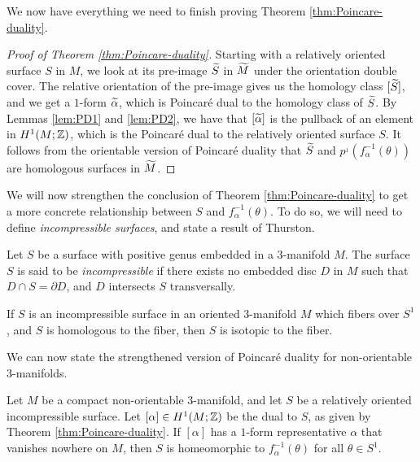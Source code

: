 We now have everything we need to finish proving Theorem \ref{thm:Poincare-duality}.
\begin{proof}[Proof of Theorem \ref{thm:Poincare-duality}]
  Starting with a relatively oriented surface $S$ in $M$, we look at its pre-image $\widetilde{S}$ in $\widetilde{M}$ under the orientation double cover.
  The relative orientation of the pre-image gives us the homology class $[\widetilde{S}]$, and we get a $1$-form $\widetilde{\alpha}$, which is Poincar\'e dual to the homology class of $\widetilde{S}$.
  By Lemmas \ref{lem:PD1} and \ref{lem:PD2}, we have that $[\widetilde{\alpha}]$ is the pullback of an element in $H^1(M; \mathbb{Z})$, which is the Poincar\'e dual to the relatively oriented surface $S$.
  It follows from the orientable version of Poincar\'e duality that $\widetilde{S}$ and $p^{_1}(f_{\alpha}^{-1}(\theta))$ are homologous surfaces in $\widetilde{M}$.
\end{proof}

We will now strengthen the conclusion of Theorem \ref{thm:Poincare-duality} to get a more concrete relationship between $S$ and $f_{\alpha}^{-1}(\theta)$.
To do so, we will need to define \emph{incompressible surfaces}, and state a result of Thurston.

\begin{defn}
  Let $S$ be a surface with positive genus embedded in a $3$-manifold $M$.
  The surface $S$ is said to be \emph{incompressible} if there exists no embedded disc $D$ in $M$ such that $D \cap S = \partial D$, and $D$ intersects $S$ transversally.
\end{defn}

\begin{thm}
  \label{thm:Thur2}
If $S$ is an incompressible surface in an oriented $3$-manifold $M$ which fibers over $S^1$, and $S$ is homologous to the fiber, then $S$ is isotopic to the fiber.
\end{thm}

We can now state the strengthened version of Poincar\'e duality for non-orientable $3$-manifolds.
\begin{thm}
  \label{thm:strong-duality}
  Let $M$ be a compact non-orientable $3$-manifold, and let $S$ be a relatively oriented incompressible surface.
  Let $[\alpha] \in H^1(M; \mathbb{Z})$ be the dual to $S$, as given by Theorem \ref{thm:Poincare-duality}.
  If $[\alpha]$ has a $1$-form representative $\alpha$ that vanishes nowhere on $M$, then $S$ is homeomorphic to $f_{\alpha}^{-1}(\theta)$ for all $\theta \in S^1$.
\end{thm}


